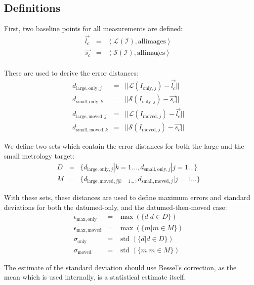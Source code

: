 \documentclass[11pt,a4paper,twoside]{scrartcl}
\DeclareMathOperator{\std}{std}
\begin{document}
\subsection{Definitions}

First, two baseline points for all measurements are defined:
\begin{eqnarray}
  \vec{l_c} & =  & \left< \mathcal{L(I)}, \mathrm{ all images} \right> \\
  \vec{s_c} & =  & \left< \mathcal{S(I)}, \mathrm{ all images} \right> \\
\end{eqnarray}

These are used to derive the error distances:
\begin{eqnarray}
  d_{\mathrm{large}, \mathrm{only}, j} & = & || \mathcal{L}(I_{\mathrm{only},j}) - \vec{l_c} ||\\
  d_{\mathrm{small}, \mathrm{only}, k} & = & || \mathcal{S}(I_{\mathrm{only},j}) - \vec{s_c} ||\\
  d_{\mathrm{large}, \mathrm{moved}, j} & = & ||  \mathcal{L}(I_{\mathrm{moved},j}) - \vec{l_c}|| \\
  d_{\mathrm{small}, \mathrm{moved}, k} & = & || \mathcal{S}(I_{\mathrm{moved},j}) - \vec{s_c} ||
\end{eqnarray}

We define two sets which contain the error distances for both the
large and the small metrology target:
\begin{eqnarray}
  D & = & \{d_{\mathrm{large}, \mathrm{only}, j} | k = 1 \ldots, d_{\mathrm{small}, \mathrm{only}, j} | j = 1 \ldots \} \\
  M & = & \{d_{\mathrm{large}, \mathrm{moved}, j | k = 1 \ldots}, d_{\mathrm{small}, \mathrm{moved}, j}    | j = 1 \ldots \}
\end{eqnarray}

With these sets, these distances are used to define maximum errors and standard deviations for both
the datumed-only, and the datumed-then-moved case:
\begin{eqnarray}
  \epsilon_\mathrm{max,only} & = & \max(\{d | d \in D\}) \\
  \epsilon_\mathrm{max,moved} & = & \max(\{m | m \in M\}) \\
  \sigma_\mathrm{only} & = & \std(\{d | d \in D\}) \\
  \sigma_\mathrm{moved} & = & \std(\{m | m \in M\})
\end{eqnarray}

The estimate of the standard deviation should use Bessel's correction,
as the mean which is used internally, is a statistical estimate itself.
\end{document}
